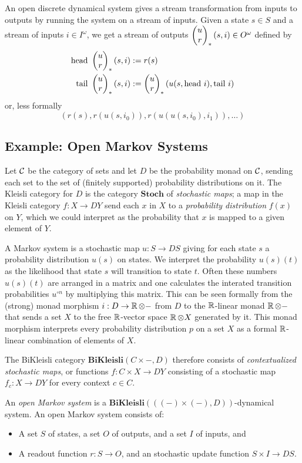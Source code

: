 An open discrete dynamical system gives a stream transformation from inputs to
outputs by running the system on a stream of inputs. Given a state
$s \in S$ and a stream of inputs $i \in I^{\omega}$, we get a stream of outputs
$\begin{pmatrix}{u} \\ {r} \end{pmatrix}_{\ast}(s, i) \in O^{\omega}$ defined by
\begin{align*}
  \text{head } \begin{pmatrix}{u} \\ {r} \end{pmatrix}_{\ast}(s, i) &:= r(s) \\
  \text{tail } \begin{pmatrix}{u} \\ {r} \end{pmatrix}_{\ast}(s, i) &:= \begin{pmatrix}{u} \\ {r} \end{pmatrix}_{\ast}(u(s, \text{head }i), \text{tail } i)
\end{align*}
or, less formally
$$(r(s), r(u(s, i_0)), r(u(u(s, i_0), i_1)), \ldots)$$

\subsection{Example: Open Markov Systems}

Let $\operatorname{\mathcal{C}}$ be the category of sets and let $D$ be the probability monad on $\operatorname{\mathcal{C}}$,
sending each set to the set of (finitely supported) probability distributions on
it. The Kleisli category for $D$ is the category $\textbf{Stoch}$ of
\emph{stochastic maps}; a map in the Kleisli category $f : X \to DY$ send each
$x$ in $X$ to a \emph{probability distribution} $f(x)$ on $Y$, which we could
interpret as the probability that $x$ is mapped to a given element of $Y$.

A Markov system is a stochastic map $u : S \to DS$ giving for each state $s$ a
probability distribution $u(s)$ on states. We interpret the probability
$u(s)(t)$ as the likelihood that state $s$ will transition to state $t$. Often
these numbers $u(s)(t)$ are arranged in a matrix and one calculates the
interated transition probabilities $u^{\circ n}$ by multiplying this matrix.
This can be seen formally from the (strong) monad morphism $i : D \to \operatorname{\mathbb{R}} \otimes -$
from $D$ to the $\operatorname{\mathbb{R}}$-linear monad $\operatorname{\mathbb{R}} \otimes -$ that sends a set $X$ to the
free $\operatorname{\mathbb{R}}$-vector space $\operatorname{\mathbb{R}} \otimes X$ generated by it. This monad morphism
interprets every probability distribution $p$ on a set $X$ as a formal $\operatorname{\mathbb{R}}$-linear
combination of elements of $X$.


The BiKleisli category $\textbf{BiKleisli}(C \times -, D)$ therefore consists of
\emph{contextualized stochastic maps}, or functions $f : C \times X \to D Y$
consisting of a stochastic map $f_c : X \to DY$ for every context $c \in C$.
\begin{defn}
An \emph{open Markov system} is a $\textbf{BiKleisli}(((-) \times (-),
D))$-dynamical system. An open Markov system consists of:
\begin{itemize}
\item A set $S$ of states, a set $O$ of outputs, and a set $I$ of inputs, and
\item A readout function $r : S \to O$, and an stochastic update function $S
  \times I \to D S$.
\end{itemize}
\end{defn}

